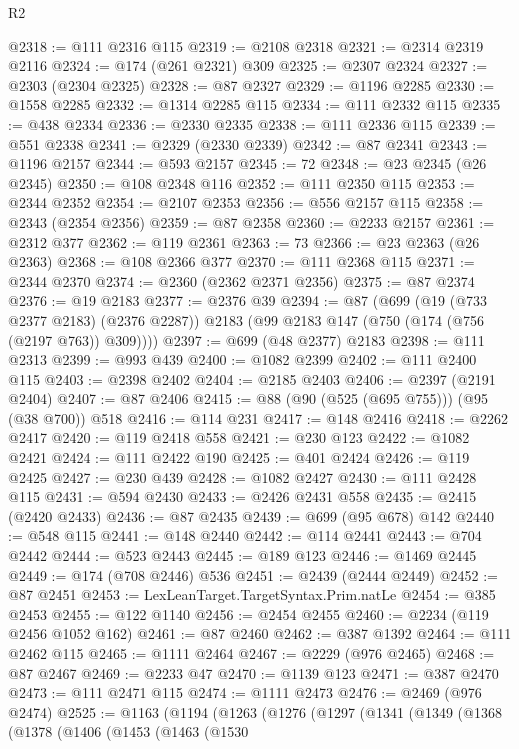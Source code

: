 \begin{lexlean}{R2}
\begin{coremodule}
@2318 := @111 @2316 @115
@2319 := @2108 @2318
@2321 := @2314 @2319 @2116
@2324 := @174 (@261 @2321) @309
@2325 := @2307 @2324
@2327 := @2303 (@2304 @2325)
@2328 := @87 @2327
@2329 := @1196 @2285
@2330 := @1558 @2285
@2332 := @1314 @2285 @115
@2334 := @111 @2332 @115
@2335 := @438 @2334
@2336 := @2330 @2335
@2338 := @111 @2336 @115
@2339 := @551 @2338
@2341 := @2329 (@2330 @2339)
@2342 := @87 @2341
@2343 := @1196 @2157
@2344 := @593 @2157
@2345 := 72
@2348 := @23 @2345 (@26 @2345)
@2350 := @108 @2348 @116
@2352 := @111 @2350 @115
@2353 := @2344 @2352
@2354 := @2107 @2353
@2356 := @556 @2157 @115
@2358 := @2343 (@2354 @2356)
@2359 := @87 @2358
@2360 := @2233 @2157
@2361 := @2312 @377
@2362 := @119 @2361
@2363 := 73
@2366 := @23 @2363 (@26 @2363)
@2368 := @108 @2366 @377
@2370 := @111 @2368 @115
@2371 := @2344 @2370
@2374 := @2360 (@2362 @2371 @2356)
@2375 := @87 @2374
@2376 := @19 @2183
@2377 := @2376 @39
@2394 := @87
    (@699
      (@19 (@733 @2377 @2183) (@2376 @2287))
      @2183
      (@99 @2183 @147 (@750 (@174 (@756 (@2197 @763)) @309))))
@2397 := @699 (@48 @2377) @2183
@2398 := @111 @2313
@2399 := @993 @439
@2400 := @1082 @2399
@2402 := @111 @2400 @115
@2403 := @2398 @2402
@2404 := @2185 @2403
@2406 := @2397 (@2191 @2404)
@2407 := @87 @2406
@2415 := @88 (@90 (@525 (@695 @755))) (@95 (@38 @700)) @518
@2416 := @114 @231
@2417 := @148 @2416
@2418 := @2262 @2417
@2420 := @119 @2418 @558
@2421 := @230 @123
@2422 := @1082 @2421
@2424 := @111 @2422 @190
@2425 := @401 @2424
@2426 := @119 @2425
@2427 := @230 @439
@2428 := @1082 @2427
@2430 := @111 @2428 @115
@2431 := @594 @2430
@2433 := @2426 @2431 @558
@2435 := @2415 (@2420 @2433)
@2436 := @87 @2435
@2439 := @699 (@95 @678) @142
@2440 := @548 @115
@2441 := @148 @2440
@2442 := @114 @2441
@2443 := @704 @2442
@2444 := @523 @2443
@2445 := @189 @123
@2446 := @1469 @2445
@2449 := @174 (@708 @2446) @536
@2451 := @2439 (@2444 @2449)
@2452 := @87 @2451
@2453 := LexLeanTarget.TargetSyntax.Prim.natLe
@2454 := @385 @2453
@2455 := @122 @1140
@2456 := @2454 @2455
@2460 := @2234 (@119 @2456 @1052 @162)
@2461 := @87 @2460
@2462 := @387 @1392
@2464 := @111 @2462 @115
@2465 := @1111 @2464
@2467 := @2229 (@976 @2465)
@2468 := @87 @2467
@2469 := @2233 @47
@2470 := @1139 @123
@2471 := @387 @2470
@2473 := @111 @2471 @115
@2474 := @1111 @2473
@2476 := @2469 (@976 @2474)
@2525 := @1163
    (@1194
      (@1263
        (@1276
          (@1297
            (@1341
              (@1349
                (@1368
                  (@1378
                    (@1406
                      (@1453
                        (@1463
                          (@1530

\end{coremodule}
\end{lexlean}

